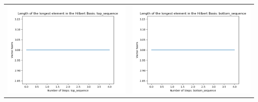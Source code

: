 \documentclass[10pt]{article}
\begin{document}
\begin{tabular}{c|c}
\begin{minipage}{.4\textwidth}
\includegraphics[width=\textwidth]{"DATA/4d/5 generators 2 bound B/top_sequence LENGTH"}
\end{minipage} &
\begin{minipage}{.4\textwidth}
\includegraphics[width=\textwidth]{"DATA/4d/5 generators 2 bound B bottomup/bottom_sequence LENGTH"}
\end{minipage}
\end{tabular}
\end{document}
